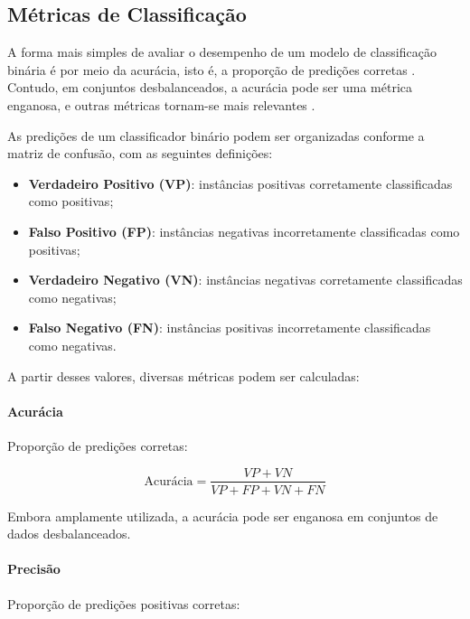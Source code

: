 \documentclass[12pt]{article}
\begin{document}






\subsection{Métricas de Classificação}
\label{sec:metrics_classification}

A forma mais simples de avaliar o desempenho de um modelo de classificação binária é por meio da acurácia, isto é, a proporção de predições corretas \cite{bishop2006pattern}. Contudo, em conjuntos desbalanceados, a acurácia pode ser uma métrica enganosa, e outras métricas tornam-se mais relevantes \cite{goodfellow2016}.

As predições de um classificador binário podem ser organizadas conforme a matriz de confusão, com as seguintes definições:

\begin{itemize}[noitemsep]
    \item \textbf{Verdadeiro Positivo (VP)}: instâncias positivas corretamente classificadas como positivas;
    \item \textbf{Falso Positivo (FP)}: instâncias negativas incorretamente classificadas como positivas;
    \item \textbf{Verdadeiro Negativo (VN)}: instâncias negativas corretamente classificadas como negativas;
    \item \textbf{Falso Negativo (FN)}: instâncias positivas incorretamente classificadas como negativas.
\end{itemize}

A partir desses valores, diversas métricas podem ser calculadas:

\paragraph{Acurácia} Proporção de predições corretas:

\begin{equation}
\text{Acurácia} = \frac{VP + VN}{VP + FP + VN + FN}
\end{equation}

Embora amplamente utilizada, a acurácia pode ser enganosa em conjuntos de dados desbalanceados.

\paragraph{Precisão} Proporção de predições positivas corretas:
\end{document}
